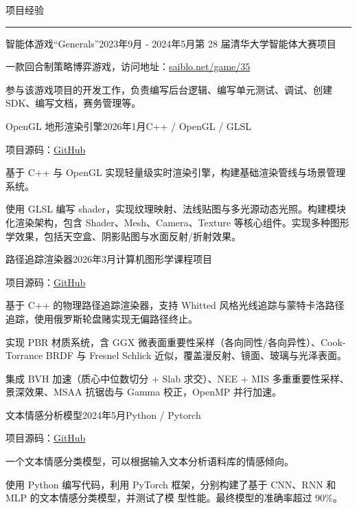 \documentclass{resume} %
\renewenvironment{rSection}[1]{
\sectionskip
\textcolor{TsinghuaPurple}{\MakeUppercase{#1}}
\sectionlineskip
\hrule
\begin{list}{}{
\setlength{\leftmargin}{0em}
}
\item[]
}{
\end{list}
}
\begin{document}

\begin{rSection}{项目经验}

\begin{rSubsection}{智能体游戏``Generals''}{2023年9月 - 2024年5月}{第 28 届清华大学智能体大赛项目}{}
\item 一款回合制策略博弈游戏，访问地址：\href{https://www.saiblo.net/game/35}{saiblo.net/game/35}
\item 参与该游戏项目的开发工作，负责编写后台逻辑、编写单元测试、调试、创建 SDK、编写文档，赛务管理等。
\end{rSubsection}  

\begin{rSubsection}{OpenGL 地形渲染引擎}{2026年1月}{C++ / OpenGL / GLSL}{}
\item 项目源码：\href{https://github.com/Esperarr/Terrain_Engine}{GitHub}
\item 基于 C++ 与 OpenGL 实现轻量级实时渲染引擎，构建基础渲染管线与场景管理系统。
\item 使用 GLSL 编写 shader，实现纹理映射、法线贴图与多光源动态光照。构建模块化渲染架构，包含 Shader、Mesh、Camera、Texture 等核心组件。实现多种图形学效果，包括天空盒、阴影贴图与水面反射/折射效果。
\end{rSubsection}

\begin{rSubsection}{路径追踪渲染器}{2026年3月}{计算机图形学课程项目}{}
\item 项目源码：\href{https://github.com/Esperarr/TinyPathTracer}{GitHub}
\item 基于 C++ 的物理路径追踪渲染器，支持 Whitted 风格光线追踪与蒙特卡洛路径追踪，使用俄罗斯轮盘赌实现无偏路径终止。
\item 实现 PBR 材质系统，含 GGX 微表面重要性采样（各向同性/各向异性）、Cook-Torrance BRDF 与 Fresnel Schlick 近似，覆盖漫反射、镜面、玻璃与光泽表面。
\item 集成 BVH 加速（质心中位数切分 + Slab 求交）、NEE + MIS 多重重要性采样、景深效果、MSAA 抗锯齿与 Gamma 校正，OpenMP 并行加速。
\end{rSubsection}

\begin{rSubsection}{文本情感分析模型}{2024年5月}{Python / Pytorch }{} 
\item 项目源码：\href{https://github.com/Esperarr/SentimentAnalysis}{GitHub}
\item 一个文本情感分类模型，可以根据输入文本分析语料库的情感倾向。
\item 使用 Python 编写代码，利用 PyTorch 框架，分别构建了基于 CNN、RNN 和 MLP 的文本情感分类模型，并测试了模
型性能。最终模型的准确率超过 90\%。
\end{rSubsection}


\end{rSection}
\end{document}
